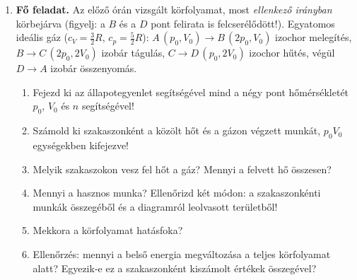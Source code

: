 \documentclass[12pt]{article}
\begin{document}
\newpage
\begin{minipage}[t]{0.70\linewidth}\vspace{0pt}
\begin{enumerate}[start=4]
\item \textbf{Fő feladat.} Az előző órán vizsgált körfolyamat, most \emph{ellenkező
  irányban} körbejárva (figyelj: a $B$ és a $D$ pont felirata is felcserélődött!).
  Egyatomos ideális gáz ($c_V = \tfrac32 R$, $c_p = \tfrac52 R$):
  $A\,(p_0, V_0) \to B\,(2p_0, V_0)$ izochor melegítés,
  $B \to C\,(2p_0, 2V_0)$ izobár tágulás, $C \to D\,(p_0, 2V_0)$ izochor hűtés,
  végül $D \to A$ izobár összenyomás.
  \begin{enumerate}
    \item Fejezd ki az állapotegyenlet segítségével mind a négy pont hőmérsékletét
      $p_0$, $V_0$ és $n$ segítségével!
    \item Számold ki szakaszonként a közölt hőt és a gázon végzett munkát,
      $p_0V_0$ egységekben kifejezve!
    \item Melyik szakaszokon vesz fel hőt a gáz? Mennyi a felvett hő összesen?
    \item Mennyi a hasznos munka? Ellenőrizd két módon: a szakaszonkénti munkák
      összegéből és a diagramról leolvasott területből!
    \item Mekkora a körfolyamat hatásfoka?
    \item Ellenőrzés: mennyi a belső energia megváltozása a teljes körfolyamat alatt?
      Egyezik-e ez a szakaszonként kiszámolt értékek összegével?
  \end{enumerate}
\end{enumerate}
\end{minipage}\hfill
\begin{minipage}[t]{0.27\linewidth}\vspace{0pt}\centering
\end{minipage}
\end{document}
